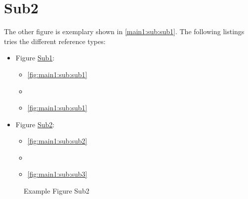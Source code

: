 \section[Sub2]{Sub2}\label{main1:sub:sub2}

The other figure is exemplary shown in \autoref{main1:sub:sub1}. The following listings tries the different reference types:
\begin{itemize}
    \item Figure \hyperref[fig:main1:sub:sub1]{Sub1}:
        \begin{itemize}
            \item \autoref{fig:main1:sub:sub1}
            \item {}
            \item \ref{fig:main1:sub:sub1}
        \end{itemize}
    \item Figure \hyperref[fig:main1:sub:sub2]{Sub2}:
        \begin{itemize}
            \item \autoref{fig:main1:sub:sub2}
            \item {}
            \item \ref{fig:main1:sub:sub3}
        \end{itemize}
\end{itemize}


\begin{figure}[!h]
    \caption[{Main1; Sub; Sub2}]{Example Figure Sub2}
    \label{fig:main1:sub:sub2}
\end{figure}

